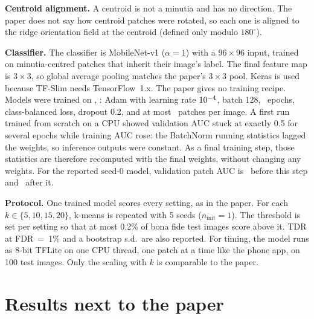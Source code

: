 \IfFileExists{IEEEtran.cls}{\documentclass[conference]{IEEEtran}}{\documentclass[twocolumn,10pt]{article}}
\begin{document}
\textbf{Centroid alignment.} A centroid is not a minutia and has no direction. The paper does not say
how centroid patches were rotated, so each one is aligned to the ridge orientation field at the centroid
(defined only modulo $180^\circ$).

\textbf{Classifier.} The classifier is MobileNet-v1 ($\alpha=1$) with a $96\times96$ input, trained on minutia-centred
patches that inherit their image's label. The final feature map is $3\times3$, so global average pooling
matches the paper's $3\times3$ pool. Keras is used because TF-Slim needs TensorFlow~1.x. The paper gives
no training recipe. Models were trained on \TrainHardware, \TrainInit: Adam with learning rate $10^{-4}$,
batch 128, \NEpochs\ epochs, class-balanced loss, dropout 0.2, and at most \PatchCap\ patches per image.
A first run trained from scratch on a CPU showed validation AUC stuck at exactly 0.5 for several epochs
while training AUC rose: the BatchNorm running statistics lagged the weights, so inference outputs were
constant. As a final training step, those statistics are therefore recomputed with the final weights,
without changing any weights. For the reported seed-0 model, validation patch AUC is \ValAUCBefore\
before this step and \ValAUCAfter\ after it.

\textbf{Protocol.} One trained model scores every setting, as in the paper. For each
$k\in\{5,10,15,20\}$, k-means is repeated with 5 seeds ($n_\text{init}=1$). The threshold is set per
setting so that at most 0.2\% of bona fide test images score above it. TDR at FDR~=~1\% and a bootstrap s.d.\ are also
reported. For timing, the model runs as 8-bit TFLite on one CPU thread, one patch at a time
like the phone app, on 100 test images. Only the scaling with $k$ is comparable to the paper.

\section{Results next to the paper}
\begin{table}[t]
\centering\caption{Table~2 of~\cite{chugh2019} next to the synthetic-data reproduction. Paper: phone,
quantised model, s.d.\ over 5 repeats. Ours: CNN calls per image, latency on one CPU thread (TFLite),
TDR (\%) at FDR~=~0.2\% with s.d.\ over 5 k-means seeds (bootstrap s.d.\ for ``All''), and TDR at
FDR~=~1\%. Only differences between rows are comparable across the two halves.}
\label{tab:main}\resizebox{\columnwidth}{!}{}
\end{table}
\end{document}
